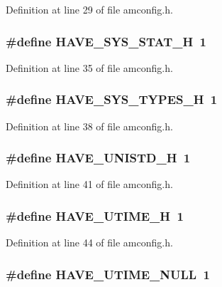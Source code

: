 Definition at line 29 of file amconfig.h.
\subsubsection[{HAVE\_\-SYS\_\-STAT\_\-H}]{\setlength{\rightskip}{0pt plus 5cm}\#define HAVE\_\-SYS\_\-STAT\_\-H~1}\label{amconfig_8h_ace156430ba007d19b4348a950d0c692b}


Definition at line 35 of file amconfig.h.
\subsubsection[{HAVE\_\-SYS\_\-TYPES\_\-H}]{\setlength{\rightskip}{0pt plus 5cm}\#define HAVE\_\-SYS\_\-TYPES\_\-H~1}\label{amconfig_8h_a69dc70bea5d1f8bd2be9740e974fa666}


Definition at line 38 of file amconfig.h.
\subsubsection[{HAVE\_\-UNISTD\_\-H}]{\setlength{\rightskip}{0pt plus 5cm}\#define HAVE\_\-UNISTD\_\-H~1}\label{amconfig_8h_a219b06937831d0da94d801ab13987639}


Definition at line 41 of file amconfig.h.
\subsubsection[{HAVE\_\-UTIME\_\-H}]{\setlength{\rightskip}{0pt plus 5cm}\#define HAVE\_\-UTIME\_\-H~1}\label{amconfig_8h_ae7a456890df8dd880d5716d1995ef51d}


Definition at line 44 of file amconfig.h.
\subsubsection[{HAVE\_\-UTIME\_\-NULL}]{\setlength{\rightskip}{0pt plus 5cm}\#define HAVE\_\-UTIME\_\-NULL~1}\label{amconfig_8h_aa52fe218a2c8fe3a62ecb3e81c4ae746}


